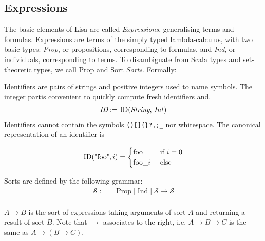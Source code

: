 \subsection{Expressions}

The basic elements of Lisa are called \textit{Expressions}, generalising terms and formulas. Expressions are terms of the simply typed lambda-calculus, with two basic types: \textit{Prop}, or propositions, corresponding to formulas, and \textit{Ind}, or individuals, corresponding to terms. To disambiguate from Scala types and set-theoretic types, we call Prop and Sort \textit{Sorts}. Formally:

\begin{definition}[Identifiers]
  Identifiers are pairs of strings and positive integers used to name symbols. The integer partis convenient to quickly compute fresh identifiers and.
  \begin{align}
    \textit{ID} := & ~\text{ID(\textit{String}, \textit{Int})} \\
  \end{align}
  Identifiers cannot contain the symbols \lstinline|()[]{}?,;_| nor whitespace. The canonical representation of an identifier is

  $$
  \text{ID}(\text{"foo"}, i) =
  \begin{cases}
    \text{foo} & \text{ if } i=0\\
    \text{foo\textunderscore}i & \text{ else}
  \end{cases}
  $$

\end{definition}

\begin{definition}[Sorts]
  Sorts are defined by the following grammar:
  \begin{align}
    \mathcal{S} := & ~\text{Prop} \mid \text{Ind} \mid \mathcal{S} \rightarrow \mathcal{S} \\
  \end{align}

  $A \rightarrow B$ is the sort of expressions taking arguments of sort $A$ and returning a result of sort $B$. Note that $\rightarrow$ associates to the right, i.e. $A \rightarrow B \rightarrow C$ is the same as $A \rightarrow (B \rightarrow C)$.
\end{definition}

